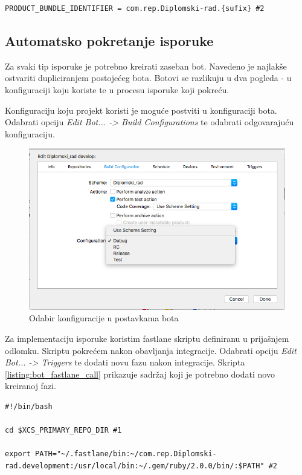 \documentclass[times, utf8, diplomski, numeric]{fer}
\begin{document}
\begin{appendices}
\begin{lstlisting}[caption=Sadržaj .xcconfig datoteke, label=listing:xcconfig]
PRODUCT_BUNDLE_IDENTIFIER = com.rep.Diplomski-rad.{sufix} #2
\end{lstlisting}

\subsection{Automatsko pokretanje isporuke}

Za svaki tip isporuke je potrebno kreirati zaseban bot. Navedeno je najlakše ostvariti dupliciranjem postojećeg bota. Botovi se razlikuju u dva pogleda - u konfiguraciji koju koriste te u procesu isporuke koji pokreću.

Konfiguraciju koju projekt koristi je moguće postviti u konfiguraciji bota. Odabrati opciju \textit{Edit Bot... -> Build Configurations} te odabrati odgovarajuću konfiguraciju.

\begin{figure}
\centering
\includegraphics[scale=0.5]{BotConfiguration}
\caption{Odabir konfiguracije u postavkama bota}
\label{fig:BotConfiguration}
\end{figure}

Za implementaciju isporuke koristim fastlane skriptu definiranu u prijašnjem odlomku. Skriptu pokrećem nakon obavljanja integracije. Odabrati opciju \textit{Edit Bot... -> Triggers} te dodati novu fazu nakon integracije. Skripta \ref{listing:bot_fastlane_call} prikazuje sadržaj koji je potrebno dodati novo kreiranoj fazi.

\begin{lstlisting}[caption=Sadržaj faze nakon obavljanja isporuke, label=listing:bot_fastlane_call]
#!/bin/bash

cd $XCS_PRIMARY_REPO_DIR #1

export PATH="~/.fastlane/bin:~/com.rep.Diplomski-rad.development:/usr/local/bin:~/.gem/ruby/2.0.0/bin/:$PATH" #2


\end{lstlisting}
\end{appendices}
\end{document}
